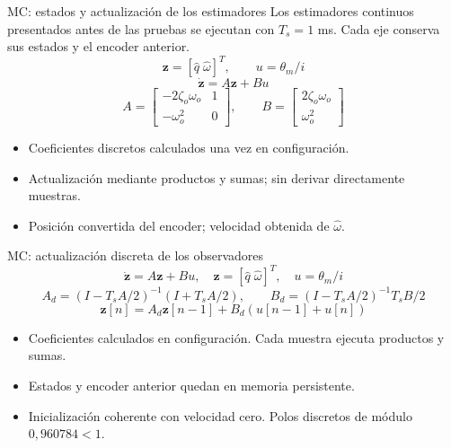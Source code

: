 \documentclass[aspectratio=169,11pt]{beamer}
\begin{document}
\begin{frame}[t,label=slide57]{MC: estados y actualización de los estimadores}
\relax
\small Los estimadores continuos presentados antes de las pruebas se ejecutan con $T_s=1$ ms. Cada eje conserva sus estados y el encoder anterior.
\[\boldsymbol z=[\hat q\;\hat\omega]^T,\qquad u=\theta_m/i\]
\[\dot{\boldsymbol z}=A\boldsymbol z+Bu\]
\[A=\begin{bmatrix}-2\zeta_o\omega_o&1\\-\omega_o^2&0\end{bmatrix},\qquad
B=\begin{bmatrix}2\zeta_o\omega_o\\\omega_o^2\end{bmatrix}\]
\begin{itemize}
\item Coeficientes discretos calculados una vez en configuración.
\item Actualización mediante productos y sumas; sin derivar directamente muestras.
\item Posición convertida del encoder; velocidad obtenida de $\hat\omega$.
\end{itemize}
\end{frame}
\begin{frame}[t,label=mcobservadores]{MC: actualización discreta de los observadores}
\[
\dot{\boldsymbol z}=A\boldsymbol z+Bu,\quad \boldsymbol z=[\hat q\;\hat\omega]^T,\quad u=\theta_m/i
\]
{\small
\[
A_d=(I-T_sA/2)^{-1}(I+T_sA/2),\qquad B_d=(I-T_sA/2)^{-1}T_sB/2
\]
\[
\boldsymbol z[n]=A_d\boldsymbol z[n-1]+B_d(u[n-1]+u[n])
\]
}
\begin{itemize}
\item Coeficientes calculados en configuración. Cada muestra ejecuta productos y sumas.
\item Estados y encoder anterior quedan en memoria persistente.
\item Inicialización coherente con velocidad cero. Polos discretos de módulo $0{,}960784<1$.
\end{itemize}
\end{frame}
\end{document}
